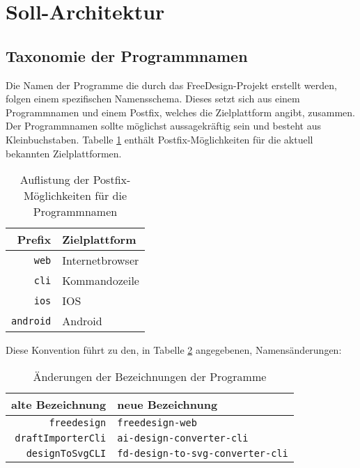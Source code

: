 \section{Soll-Architektur}
\subsection{Taxonomie der Programmnamen}
Die Namen der Programme die durch das FreeDesign-Projekt erstellt werden, folgen einem spezifischen Namensschema. Dieses setzt sich aus einem Programmnamen und einem Postfix, welches die Zielplattform angibt, zusammen. Der Programmnamen sollte möglichst aussagekräftig sein und besteht aus Kleinbuchstaben. Tabelle \ref{table:postfix} enthält Postfix-Möglichkeiten für die aktuell bekannten Zielplattformen.

\begin{table}[H]
    \centering
    \caption{Auflistung der Postfix-Möglichkeiten für die Programmnamen}
    \label{table:postfix}
    \begin{tabular}{r|l}
        \textbf{Prefix} & \textbf{Zielplattform} \\
        \hline
        \lstinline|web| & Internetbrowser \\
        \lstinline|cli| & Kommandozeile \\
        \lstinline|ios| & IOS \\
        \lstinline|android| & Android 
    \end{tabular}
\end{table}

Diese Konvention führt zu den, in Tabelle \ref{table:Programmnamen} angegebenen, Namensänderungen: 
\begin{table}[H]
    \centering
    \caption{Änderungen der Bezeichnungen der Programme}
    \label{table:Programmnamen}
    \begin{tabular}{r|l}
        \textbf{alte Bezeichnung} & \textbf{neue Bezeichnung} \\
        \hline
        \lstinline|freedesign| & \lstinline|freedesign-web| \\
        \lstinline|draftImporterCli| & \lstinline|ai-design-converter-cli| \\
        \lstinline|designToSvgCLI| & \lstinline|fd-design-to-svg-converter-cli| 
    \end{tabular}
\end{table}

